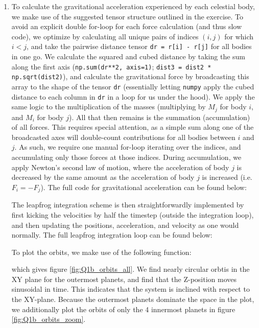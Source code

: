 \begin{enumerate}[label=(\alph*)]
    \item To calculate the gravitational acceleration experienced by each celestial body, we make use of the suggested tensor structure outlined in the exercise. To avoid an explicit double for-loop for each force calculation (and thus slow code), we optimize by calculating all unique pairs of indices $(i,j)$ for which $i < j$, and take the pairwise distance tensor \verb|dr = r[i] - r[j]| for all bodies in one go. We calculate the squared and cubed distance by taking the sum along the first axis (\verb|np.sum(dr**2, axis=1)|; \verb|dist3 = dist2 * np.sqrt(dist2)|), and calculate the gravitational force by broadcasting this array to the shape of the tensor \verb|dr| (essentially letting \verb|numpy| apply the cubed distance to each column in \verb|dr| in a loop for us under the hood). We apply the same logic to the multiplication of the masses (multiplying by $M_j$ for body $i$, and $M_i$ for body $j$). All that then remains is the summation (accumulation) of all forces. This requires special attention, as a simple sum along one of the broadcasted axes will double-count contributions for all bodies between $i$ and $j$. As such, we require one manual for-loop iterating over the indices, and accumulating only those forces at those indices. During accumulation, we apply Newton's second law of motion, where the acceleration of body $j$ is decreased by the same amount as the acceleration of body $j$ is increased (i.e. $F_i = -F_j$). The full code for gravitational acceleration can be found below:
    
    
    The leapfrog integration scheme is then straightforwardly implemented by first kicking the velocities by half the timestep (outside the integration loop), and then updating the positions, acceleration, and velocity as one would normally. The full leapfrog integration loop can be found below:
    
    To plot the orbits, we make use of the following function:
    
    which gives figure \ref{fig:Q1b_orbits_all}. We find nearly circular orbtis in the XY plane for the outermost planets, and find that the Z-position moves sinusoidal in time. This indicates that the system is inclined with respect to the XY-plane. Because the outermost planets dominate the space in the plot, we additionally plot the orbits of only the 4 innermost planets in figure \ref{fig:Q1b_orbits_zoom}.


\end{enumerate}
